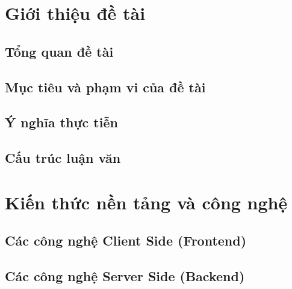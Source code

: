 \documentclass[a4paper,12pt,fleqn,print,oneside]{extarticle}
\begin{document}

\newpage
{}
\listoffigures





\newpage
{}
\listoftables





\newpage
\section{Giới thiệu đề tài}
\subsection{Tổng quan đề tài}


\subsection{Mục tiêu và phạm vi của đề tài}


\subsection{Ý nghĩa thực tiễn}


\subsection{Cấu trúc luận văn}





\newpage
\section{Kiến thức nền tảng và công nghệ}


\subsection{Các công nghệ Client Side (Frontend)}


\subsection{Các công nghệ Server Side (Backend)}

\end{document}
